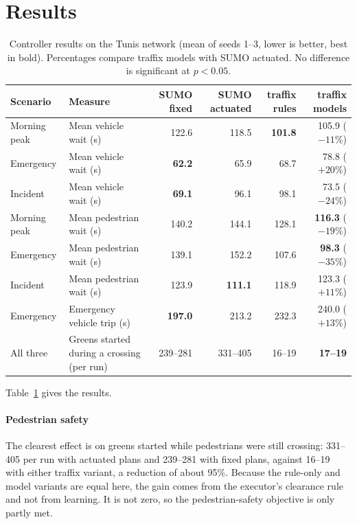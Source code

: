 \documentclass[conference]{IEEEtran}
\begin{document}
\section{Results}\label{sec:results}

\begin{table}[t]
\caption{Controller results on the Tunis network (mean of seeds 1--3, lower is better, best
in bold). Percentages compare traffix models with SUMO actuated. No difference is
significant at $p<0.05$.}
\label{tab:results}
\centering
\begin{tabular}{@{}llrrrr@{}}
\toprule
Scenario & Measure & SUMO fixed & SUMO actuated & traffix rules & traffix models \\
\midrule
Morning peak & Mean vehicle wait (s) & 122.6 & 118.5 & \textbf{101.8} & 105.9 ($-11\%$) \\
Emergency    & Mean vehicle wait (s) & \textbf{62.2} & 65.9 & 68.7 & 78.8 ($+20\%$) \\
Incident     & Mean vehicle wait (s) & \textbf{69.1} & 96.1 & 98.1 & 73.5 ($-24\%$) \\
\midrule
Morning peak & Mean pedestrian wait (s) & 140.2 & 144.1 & 128.1 & \textbf{116.3} ($-19\%$) \\
Emergency    & Mean pedestrian wait (s) & 139.1 & 152.2 & 107.6 & \textbf{98.3} ($-35\%$) \\
Incident     & Mean pedestrian wait (s) & 123.9 & \textbf{111.1} & 118.9 & 123.3 ($+11\%$) \\
\midrule
Emergency    & Emergency vehicle trip (s) & \textbf{197.0} & 213.2 & 232.3 & 240.0 ($+13\%$) \\
\midrule
All three    & Greens started during a crossing (per run) & 239--281 & 331--405 & 16--19 & \textbf{17--19} \\
\bottomrule
\end{tabular}
\end{table}

Table~\ref{tab:results} gives the results.

\paragraph{Pedestrian safety} The clearest effect is on greens started while pedestrians
were still crossing: 331--405 per run with actuated plans and 239--281 with fixed plans,
against 16--19 with either traffix variant, a reduction of about 95\%. Because the rule-only
and model variants are equal here, the gain comes from the executor's clearance rule and not
from learning. It is not zero, so the pedestrian-safety objective is only partly met.
\end{document}

